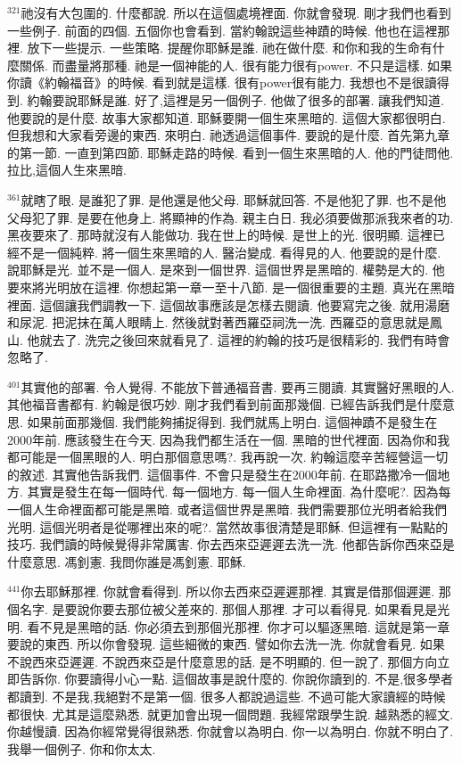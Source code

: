 \documentclass{book}
\begin{document}
$^{321}$祂沒有大包圍的.
什麼都說.
所以在這個處境裡面.
你就會發現.
剛才我們也看到一些例子.
前面的四個.
五個你也會看到.
當約翰說這些神蹟的時候.
他也在這裡那裡.
放下一些提示.
一些策略.
提醒你耶穌是誰.
祂在做什麼.
和你和我的生命有什麼關係.
而盡量將那種.
祂是一個神能的人.
很有能力很有power.
不只是這樣.
如果你讀《約翰福音》的時候.
看到就是這樣.
很有power很有能力.
我想也不是很讀得到.
約翰要說耶穌是誰.
好了,這裡是另一個例子.
他做了很多的部署.
讓我們知道.
他要說的是什麼.
故事大家都知道.
耶穌要開一個生來黑暗的.
這個大家都很明白.
但我想和大家看旁邊的東西.
來明白.
祂透過這個事件.
要說的是什麼.
首先第九章的第一節.
一直到第四節.
耶穌走路的時候.
看到一個生來黑暗的人.
他的門徒問他.
拉比,這個人生來黑暗.

$^{361}$就瞎了眼.
是誰犯了罪.
是他還是他父母.
耶穌就回答.
不是他犯了罪.
也不是他父母犯了罪.
是要在他身上.
將顯神的作為.
親主白日.
我必須要做那派我來者的功.
黑夜要來了.
那時就沒有人能做功.
我在世上的時候.
是世上的光.
很明顯.
這裡已經不是一個純粹.
將一個生來黑暗的人.
醫治變成.
看得見的人.
他要說的是什麼.
說耶穌是光.
並不是一個人.
是來到一個世界.
這個世界是黑暗的.
權勢是大的.
他要來將光明放在這裡.
你想起第一章一至十八節.
是一個很重要的主題.
真光在黑暗裡面.
這個讓我們調教一下.
這個故事應該是怎樣去閱讀.
他要寫完之後.
就用湯磨和尿泥.
把泥抹在萬人眼睛上.
然後就對著西羅亞祠洗一洗.
西羅亞的意思就是鳳山.
他就去了.
洗完之後回來就看見了.
這裡的約翰的技巧是很精彩的.
我們有時會忽略了.

$^{401}$其實他的部署.
令人覺得.
不能放下普通福音書.
要再三閱讀.
其實醫好黑眼的人.
其他福音書都有.
約翰是很巧妙.
剛才我們看到前面那幾個.
已經告訴我們是什麼意思.
如果前面那幾個.
我們能夠捕捉得到.
我們就馬上明白.
這個神蹟不是發生在2000年前.
應該發生在今天.
因為我們都生活在一個.
黑暗的世代裡面.
因為你和我都可能是一個黑眼的人.
明白那個意思嗎?.
我再說一次.
約翰這麼辛苦經營這一切的敘述.
其實他告訴我們.
這個事件.
不會只是發生在2000年前.
在耶路撒冷一個地方.
其實是發生在每一個時代.
每一個地方.
每一個人生命裡面.
為什麼呢?.
因為每一個人生命裡面都可能是黑暗.
或者這個世界是黑暗.
我們需要那位光明者給我們光明.
這個光明者是從哪裡出來的呢?.
當然故事很清楚是耶穌.
但這裡有一點點的技巧.
我們讀的時候覺得非常厲害.
你去西來亞遲遲去洗一洗.
他都告訴你西來亞是什麼意思.
馮釗憲.
我問你誰是馮釗憲.
耶穌.

$^{441}$你去耶穌那裡.
你就會看得到.
所以你去西來亞遲遲那裡.
其實是借那個遲遲.
那個名字.
是要說你要去那位被父差來的.
那個人那裡.
才可以看得見.
如果看見是光明.
看不見是黑暗的話.
你必須去到那個光那裡.
你才可以驅逐黑暗.
這就是第一章要說的東西.
所以你會發現.
這些細微的東西.
譬如你去洗一洗.
你就會看見.
如果不說西來亞遲遲.
不說西來亞是什麼意思的話.
是不明顯的.
但一說了.
那個方向立即告訴你.
你要讀得小心一點.
這個故事是說什麼的.
你說你讀到的.
不是,很多學者都讀到.
不是我,我絕對不是第一個.
很多人都說過這些.
不過可能大家讀經的時候都很快.
尤其是這麼熟悉.
就更加會出現一個問題.
我經常跟學生說.
越熟悉的經文.
你越慢讀.
因為你經常覺得很熟悉.
你就會以為明白.
你一以為明白.
你就不明白了.
我舉一個例子.
你和你太太.
\end{document}
